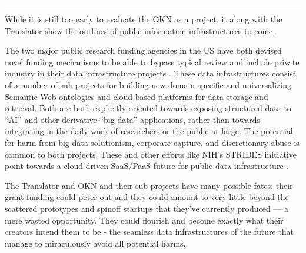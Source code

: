 \documentclass{article}
\begin{document}
\begin{center}\rule{0.5\linewidth}{0.5pt}\end{center}

While it is still too early to evaluate the OKN as a project, it along
with the Translator show the outlines of public information
infrastructures to come.

The two major public research funding agencies in the US have both
devised novel funding mechanisms to be able to bypass typical review and
include private industry in their data infrastructure projects \cite{consortiumBiomedicalDataTranslator2019, nationalsciencefoundationNSFConvergenceAccelerator2019} . These data
infrastructures consist of a number of sub-projects for building new
domain-specific and universalizing Semantic Web ontologies and
cloud-based platforms for data storage and retrieval. Both are both
explicitly oriented towards exposing structured data to ``AI'' and other
derivative ``big data'' applications, rather than towards integrating in
the daily work of researchers or the public at large. The potential for
harm from big data solutionism, corporate capture, and discretionary
abuse is common to both projects. These and other efforts like NIH's STRIDES initiative point towards a
cloud-driven SaaS/PaaS future for public data infrastructure \cite{nationalinstitutesofhealthSTRIDESInitiative2021} .

The Translator and OKN and their sub-projects have many possible fates:
their grant funding could peter out and they could amount to very little
beyond the scattered prototypes and spinoff startups that they've
currently produced --- a mere wasted opportunity. They could flourish
and become exactly what their creators intend them to be - the seamless
data infrastructures of the future that manage to miraculously avoid all
potential harms.
\end{document}
